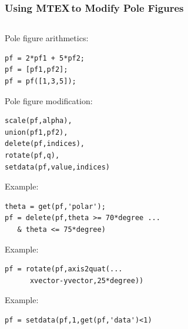 \documentclass{beamer}
\newcommand{\MTEX}{{\bf {\color{red}M}TEX\,}}%
\begin{document}
\begin{frame}[fragile]

  \frametitle{Using \MTEX to Modify Pole Figures}

  \begin{columns}
  
    \begin{column}{8.5cm}

      Pole figure arithmetics:
\begin{lstlisting}
pf = 2*pf1 + 5*pf2;
pf = [pf1,pf2]; 
pf = pf([1,3,5]);
\end{lstlisting}
      
      Pole figure modification:
      
\begin{lstlisting}
scale(pf,alpha),
union(pf1,pf2), 
delete(pf,indices), 
rotate(pf,q),
setdata(pf,value,indices)
\end{lstlisting}
      
      \begin{overprint}

        Example:
\begin{lstlisting}
theta = get(pf,'polar');
pf = delete(pf,theta >= 70*degree ...
   & theta <= 75*degree)
\end{lstlisting}
        Example:
\begin{lstlisting}
pf = rotate(pf,axis2quat(...
      xvector-yvector,25*degree))

\end{lstlisting}
        Example:
\begin{lstlisting}
pf = setdata(pf,1,get(pf,'data')<1)
\end{lstlisting}
        
      \end{overprint}
    \end{column}


\end{columns}
\end{frame}
\end{document}
